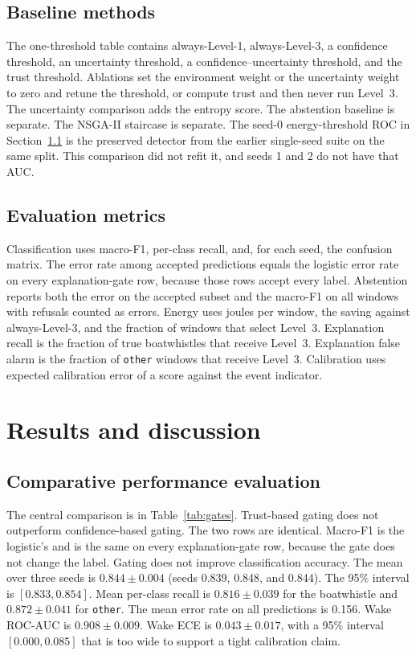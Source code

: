 \documentclass[sn-mathphys-num]{sn-jnl}%
\theoremstyle{thmstyleone}%
\theoremstyle{thmstyletwo}%
\theoremstyle{thmstylethree}%
\begin{document}
\subsection{Baseline methods}\label{sec:baselines}

The one-threshold table contains always-Level-1, always-Level-3, a confidence threshold, an uncertainty threshold, a confidence--uncertainty threshold, and the trust threshold. Ablations set the environment weight or the uncertainty weight to zero and retune the threshold, or compute trust and then never run Level~3. The uncertainty comparison adds the entropy score. The abstention baseline is separate. The NSGA-II staircase is separate. The seed-0 energy-threshold ROC in Section~\ref{sec:compare} is the preserved detector from the earlier single-seed suite on the same split. This comparison did not refit it, and seeds 1 and 2 do not have that AUC.

\subsection{Evaluation metrics}\label{sec:metrics}

Classification uses macro-F1, per-class recall, and, for each seed, the confusion matrix. The error rate among accepted predictions equals the logistic error rate on every explanation-gate row, because those rows accept every label. Abstention reports both the error on the accepted subset and the macro-F1 on all windows with refusals counted as errors. Energy uses joules per window, the saving against always-Level-3, and the fraction of windows that select Level~3. Explanation recall is the fraction of true boatwhistles that receive Level~3. Explanation false alarm is the fraction of \texttt{other} windows that receive Level~3. Calibration uses expected calibration error of a score against the event indicator.

\section{Results and discussion}\label{sec:results}

\subsection{Comparative performance evaluation}\label{sec:compare}

The central comparison is in Table~\ref{tab:gates}. Trust-based gating does not outperform confidence-based gating. The two rows are identical. Macro-F1 is the logistic's and is the same on every explanation-gate row, because the gate does not change the label. Gating does not improve classification accuracy. The mean over three seeds is $0.844 \pm 0.004$ (seeds 0.839, 0.848, and 0.844). The 95\% interval is $[0.833, 0.854]$. Mean per-class recall is $0.816 \pm 0.039$ for the boatwhistle and $0.872 \pm 0.041$ for \texttt{other}. The mean error rate on all predictions is 0.156. Wake ROC-AUC is $0.908 \pm 0.009$. Wake ECE is $0.043 \pm 0.017$, with a 95\% interval $[0.000, 0.085]$ that is too wide to support a tight calibration claim.
\end{document}
